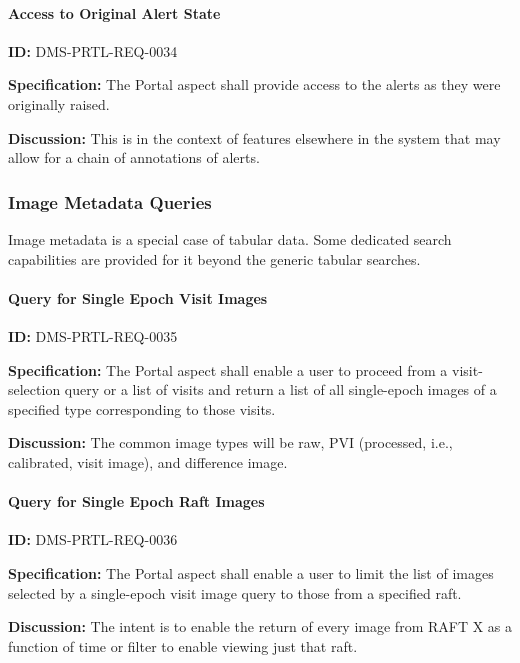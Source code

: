 \documentclass[SE,toc,lsstdraft]{lsstdoc}
\begin{document}
\paragraph{Access to Original Alert State}\hfill  %

\label{DMS-PRTL-REQ-0034}
\textbf{ID:} DMS-PRTL-REQ-0034

\textbf{Specification:}
The Portal aspect shall provide access to the alerts as they were originally raised.

\textbf{Discussion:}
This is in the context of features elsewhere in the system that may allow for a chain of annotations of alerts.

\subsubsection{Image Metadata Queries}

Image metadata is a special case of tabular data.  Some dedicated search capabilities are provided for it beyond the generic tabular searches.

\paragraph{Query for Single Epoch Visit Images}\hfill  %

\label{DMS-PRTL-REQ-0035}
\textbf{ID:} DMS-PRTL-REQ-0035

\textbf{Specification:}
The Portal aspect shall enable a user to proceed from a visit-selection query or a list of visits and return a list of all single-epoch images of a specified type corresponding to those visits.

\textbf{Discussion:}
The common image types will be raw, PVI (processed, i.e., calibrated, visit image), and difference image.

\paragraph{Query for Single Epoch Raft Images}\hfill  %

\label{DMS-PRTL-REQ-0036}
\textbf{ID:} DMS-PRTL-REQ-0036

\textbf{Specification:}
The Portal aspect shall enable a user to limit the list of images selected by a single-epoch visit image query to those from a specified raft.

\textbf{Discussion:}
The intent is to enable the return of every image from RAFT X as a function of time or filter to enable viewing just that raft.
\end{document}
